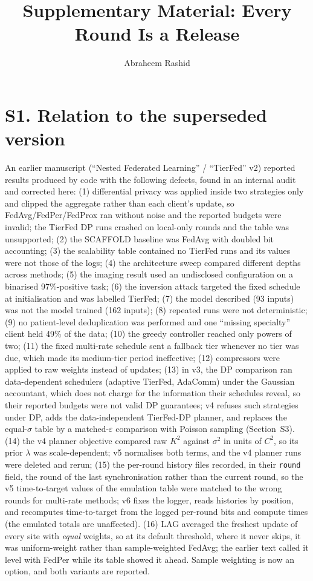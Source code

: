 \documentclass[journal]{IEEEtran}
\begin{document}
\title{Supplementary Material: Every Round Is a Release}
\author{Abraheem Rashid}
\maketitle

\section{S1. Relation to the superseded version}
An earlier manuscript (``Nested Federated Learning'' / ``TierFed'' v2) reported results produced by code with the following defects, found in an internal audit and corrected here: (1) differential privacy was applied inside two strategies only and clipped the aggregate rather than each client's update, so FedAvg/FedPer/FedProx ran without noise and the reported budgets were invalid; the TierFed DP runs crashed on local-only rounds and the table was unsupported; (2) the SCAFFOLD baseline was FedAvg with doubled bit accounting; (3) the scalability table contained no TierFed runs and its values were not those of the logs; (4) the architecture sweep compared different depths across methods; (5) the imaging result used an undisclosed configuration on a binarised 97\%-positive task; (6) the inversion attack targeted the fixed schedule at initialisation and was labelled TierFed; (7) the model described (93 inputs) was not the model trained (162 inputs); (8) repeated runs were not deterministic; (9) no patient-level deduplication was performed and one ``missing specialty'' client held 49\% of the data; (10) the greedy controller reached only powers of two; (11) the fixed multi-rate schedule sent a fallback tier whenever no tier was due, which made its medium-tier period ineffective; (12) compressors were applied to raw weights instead of updates; (13) in v3, the DP comparison ran data-dependent schedulers (adaptive TierFed, AdaComm) under the Gaussian accountant, which does not charge for the information their schedules reveal, so their reported budgets were not valid DP guarantees; v4 refuses such strategies under DP, adds the data-independent TierFed-DP planner, and replaces the equal-$\sigma$ table by a matched-$\varepsilon$ comparison with Poisson sampling (Section~S3). (14) the v4 planner objective compared raw $K^2$ against $\sigma^2$ in units of $C^2$, so its prior $\lambda$ was scale-dependent; v5 normalises both terms, and the v4 planner runs were deleted and rerun; (15) the per-round history files recorded, in their \texttt{round} field, the round of the last synchronisation rather than the current round, so the v5 time-to-target values of the emulation table were matched to the wrong rounds for multi-rate methods; v6 fixes the logger, reads histories by position, and recomputes time-to-target from the logged per-round bits and compute times (the emulated totals are unaffected). (16) LAG averaged the freshest update of every site with \emph{equal} weights, so at its default threshold, where it never skips, it was uniform-weight rather than sample-weighted FedAvg; the earlier text called it level with FedPer while its table showed it ahead. Sample weighting is now an option, and both variants are reported. 
\end{document}
